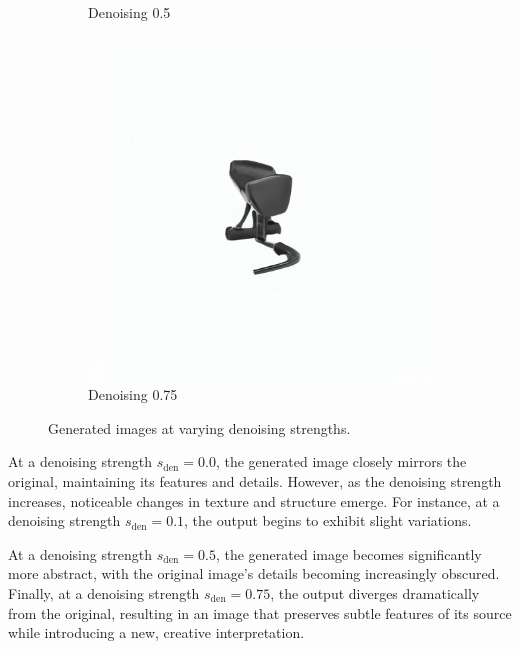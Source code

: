 \documentclass[12pt,DIV14,BCOR12mm,a4paper,footinclude=false,headinclude,parskip=half-,twoside,openright,cleardoublepage=empty,toc=index,bibliography=totoc,listof=totoc]{scrreprt}
\numberwithin{equation}{chapter}
\begin{document}
\begin{figure}
\begin{subfigure}{0.14\textwidth}
        \caption{Denoising 0.5}
    \end{subfigure}
    \begin{subfigure}{0.14\textwidth}
        \centering
        \includegraphics[width=\linewidth]{../media/image_0.75.png} %
        \caption{Denoising 0.75}
    \end{subfigure}
    
    \caption{Generated images at varying denoising strengths.}
    \label{fig:denoising_effect}
\end{figure}
At a denoising strength $s_{\text{den}} = 0.0$, the generated image closely mirrors the original, maintaining its features and details. However, as the denoising strength increases, noticeable changes in texture and structure emerge. For instance, at a denoising strength $s_{\text{den}} = 0.1$, the output begins to exhibit slight variations.

At a denoising strength $s_{\text{den}} = 0.5$, the generated image becomes significantly more abstract, with the original image’s details becoming increasingly obscured. Finally, at a denoising strength $s_{\text{den}} = 0.75$, the output diverges dramatically from the original, resulting in an image that preserves subtle features of its source while introducing a new, creative interpretation.
\end{document}
